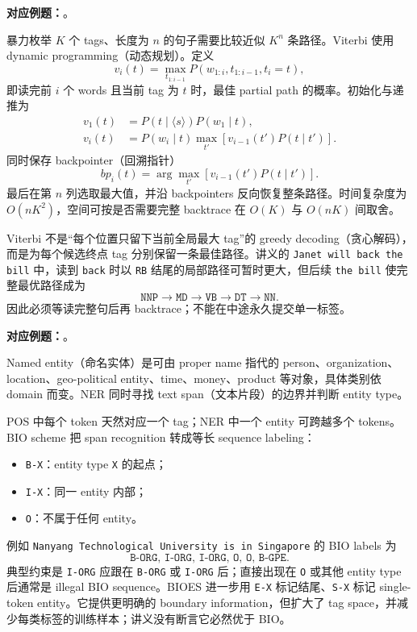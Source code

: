 \textbf{对应例题：}。


暴力枚举 $K$ 个 tags、长度为 $n$ 的句子需要比较近似 $K^n$ 条路径。Viterbi 使用 dynamic programming（动态规划）。定义
\[
  v_i(t)=\max_{t_{1:i-1}}P(w_{1:i},t_{1:i-1},t_i=t),
\]
即读完前 $i$ 个 words 且当前 tag 为 $t$ 时，最佳 partial path 的概率。初始化与递推为
\begin{align*}
  v_1(t)&=P(t\mid\langle s\rangle)P(w_1\mid t),\\
  v_i(t)&=P(w_i\mid t)
    \max_{t'}\left[v_{i-1}(t')P(t\mid t')\right].
\end{align*}
同时保存 backpointer（回溯指针）
\[
  bp_i(t)=\arg\max_{t'}\left[v_{i-1}(t')P(t\mid t')\right].
\]
最后在第 $n$ 列选取最大值，并沿 backpointers 反向恢复整条路径。时间复杂度为 $O(nK^2)$，空间可按是否需要完整 backtrace 在 $O(K)$ 与 $O(nK)$ 间取舍。

Viterbi 不是“每个位置只留下当前全局最大 tag”的 greedy decoding（贪心解码），而是为每个候选终点 tag 分别保留一条最佳路径。讲义的 \texttt{Janet will back the bill} 中，读到 \texttt{back} 时以 \texttt{RB} 结尾的局部路径可暂时更大，但后续 \texttt{the bill} 使完整最优路径成为
\[
  \texttt{NNP}\to\texttt{MD}\to\texttt{VB}\to\texttt{DT}\to\texttt{NN}.
\]
因此必须等读完整句后再 backtrace；不能在中途永久提交单一标签。

\textbf{对应例题：}。


Named entity（命名实体）是可由 proper name 指代的 person、organization、location、geo-political entity、time、money、product 等对象，具体类别依 domain 而变。NER 同时寻找 text span（文本片段）的边界并判断 entity type。

POS 中每个 token 天然对应一个 tag；NER 中一个 entity 可跨越多个 tokens。BIO scheme 把 span recognition 转成等长 sequence labeling：
\begin{itemize}
  \item \texttt{B-X}：entity type \texttt{X} 的起点；
  \item \texttt{I-X}：同一 entity 内部；
  \item \texttt{O}：不属于任何 entity。
\end{itemize}
例如 \texttt{Nanyang Technological University is in Singapore} 的 BIO labels 为
\[
  \texttt{B-ORG, I-ORG, I-ORG, O, O, B-GPE}.
\]
典型约束是 \texttt{I-ORG} 应跟在 \texttt{B-ORG} 或 \texttt{I-ORG} 后；直接出现在 \texttt{O} 或其他 entity type 后通常是 illegal BIO sequence。BIOES 进一步用 \texttt{E-X} 标记结尾、\texttt{S-X} 标记 single-token entity。它提供更明确的 boundary information，但扩大了 tag space，并减少每类标签的训练样本；讲义没有断言它必然优于 BIO。

